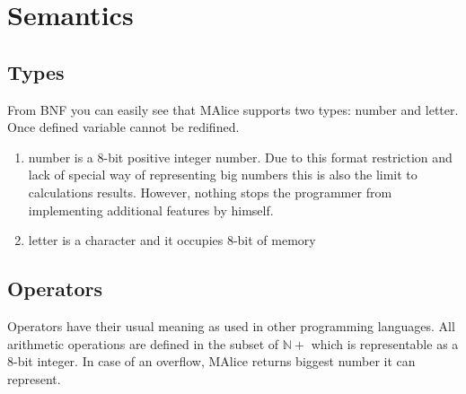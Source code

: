 \documentclass[a4wide, 11pt]{article}
\begin{document}
\section{Semantics}

\subsection{Types}

From BNF you can easily see that MAlice supports two types: number and letter. Once defined variable cannot be redifined.

\begin{enumerate}
     \item
     number is a 8-bit positive integer number. Due to this format restriction and lack of special way of representing big numbers this is also the limit to calculations results. However, nothing stops the programmer from implementing additional features by himself.  

     \item
     letter is a character and it occupies 8-bit of memory

\end{enumerate}

\subsection{Operators}

Operators have their usual meaning as used in other programming languages. All arithmetic operations are defined in the subset of $\mathbb{N+}$ which is representable as a 8-bit integer. In case of an overflow, MAlice returns biggest number it can represent.
\end{document}
